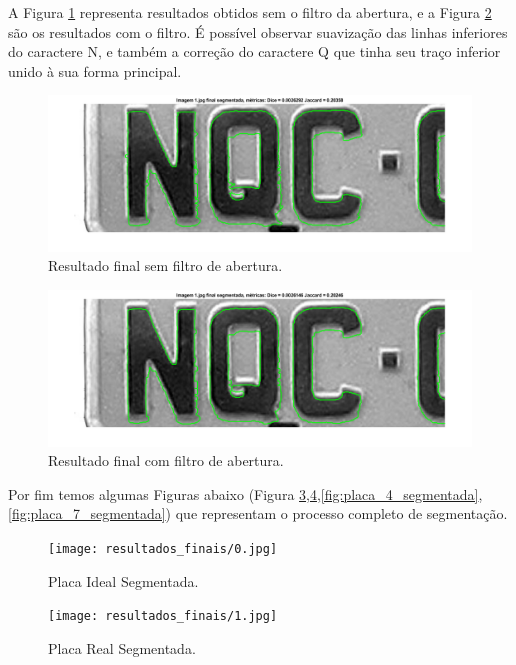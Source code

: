 \documentclass[
	12pt,				%
    oneside,			%
	a4paper,			%
	english,			%
	french,				%
	spanish,			%
	brazil,				%
	]{abntex2}
\begin{document}
A Figura \ref{fig:detalhe_sem_efeito_abertura} representa resultados obtidos sem o filtro da abertura, e a Figura \ref{fig:detalhe_efeito_abertura} são os resultados com o filtro. É possível observar suavização das linhas inferiores do caractere N, e também a correção do caractere Q que tinha seu traço inferior unido à sua forma principal.

\begin{figure}[!ht]
    \centering
    \includegraphics[scale=0.38]{etapas/detalhe_sem_efeito_abertura.png}
    \caption{Resultado final sem filtro de abertura.}
    \label{fig:detalhe_sem_efeito_abertura}
\end{figure}

\begin{figure}[!ht]
    \centering
    \includegraphics[scale=0.38]{etapas/detalhe_efeito_abertura.png}
    \caption{Resultado final com filtro de abertura.}
    \label{fig:detalhe_efeito_abertura}
\end{figure}

Por fim temos algumas Figuras abaixo (Figura \ref{fig:placa_0_segmentada},\ref{fig:placa_1_segmentada},\ref{fig:placa_4_segmentada},\ref{fig:placa_7_segmentada}) que representam o processo completo de segmentação.

\begin{figure}[!ht]
    \centering
    \texttt{[image: resultados\_finais/0.jpg]}
    \caption{Placa Ideal Segmentada.}
    \label{fig:placa_0_segmentada}
\end{figure}

\begin{figure}[!ht]
    \centering
    \texttt{[image: resultados\_finais/1.jpg]}
    \caption{Placa Real Segmentada.}
    \label{fig:placa_1_segmentada}
\end{figure}
\end{document}
